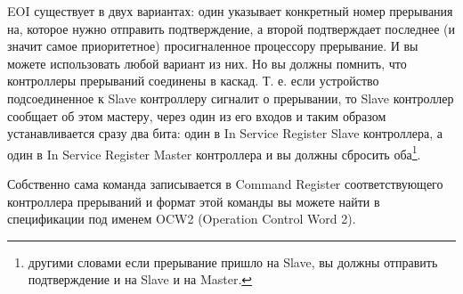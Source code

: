 EOI существует в двух вариантах: один указывает конкретный номер прерывания на,
которое нужно отправить подтверждение, а второй подтверждает последнее (и
значит самое приоритетное) просигналенное процессору прерывание. И вы можете
использовать любой вариант из них. Но вы должны помнить, что контроллеры
прерываний соединены в каскад. Т. е. если устройство подсоединенное к Slave
контроллеру сигналит о прерывании, то Slave контроллер сообщает об этом мастеру,
через один из его входов и таким образом устанавливается сразу два бита: один в
In Service Register Slave контроллера, а один в In Service Register Master
контроллера и вы должны сбросить оба\footnote{другими словами если прерывание
пришло на Slave, вы должны отправить подтверждение и на Slave и на Master.}.

Собственно сама команда записывается в Command Register соответствующего
контроллера прерываний и формат этой команды вы можете найти в спецификации под
именем OCW2 (Operation Control Word 2).
